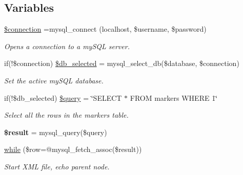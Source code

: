 \subsection*{Variables}
\begin{DoxyCompactItemize}
\item 
\hypertarget{maps_x_m_l_8php_a0d9c79b9b86b3f5891c6d3892f12c6a0}{}\hyperlink{maps_x_m_l_8php_a0d9c79b9b86b3f5891c6d3892f12c6a0}{\$connection} =mysql\+\_\+connect (localhost, \$username, \$password)\label{maps_x_m_l_8php_a0d9c79b9b86b3f5891c6d3892f12c6a0}

\begin{DoxyCompactList}\small\item\em Opens a connection to a my\+S\+Q\+L server. \end{DoxyCompactList}\item 
\hypertarget{maps_x_m_l_8php_a7ac53254461d08cd7a48196f2131e8a8}{}if(!\$connection) \hyperlink{maps_x_m_l_8php_a7ac53254461d08cd7a48196f2131e8a8}{\$db\+\_\+selected} = mysql\+\_\+select\+\_\+db(\$database, \$connection)\label{maps_x_m_l_8php_a7ac53254461d08cd7a48196f2131e8a8}

\begin{DoxyCompactList}\small\item\em Set the active my\+S\+Q\+L database. \end{DoxyCompactList}\item 
\hypertarget{maps_x_m_l_8php_a1a35e6d436c822738b4f732ffcc233c6}{}if(!\$db\+\_\+selected) \hyperlink{maps_x_m_l_8php_a1a35e6d436c822738b4f732ffcc233c6}{\$query} = \char`\"{}S\+E\+L\+E\+C\+T $\ast$ F\+R\+O\+M markers W\+H\+E\+R\+E 1\char`\"{}\label{maps_x_m_l_8php_a1a35e6d436c822738b4f732ffcc233c6}

\begin{DoxyCompactList}\small\item\em Select all the rows in the markers table. \end{DoxyCompactList}\item 
\hypertarget{maps_x_m_l_8php_a112ef069ddc0454086e3d1e6d8d55d07}{}{\bfseries \$result} = mysql\+\_\+query(\$query)\label{maps_x_m_l_8php_a112ef069ddc0454086e3d1e6d8d55d07}

\item 
\hyperlink{maps_x_m_l_8php_a896b241ebd6b7f381e7919ff0d1eb8fd}{while} (\$row=@mysql\+\_\+fetch\+\_\+assoc(\$result))
\begin{DoxyCompactList}\small\item\em Start X\+M\+L file, echo parent node. \end{DoxyCompactList}\end{DoxyCompactItemize}


